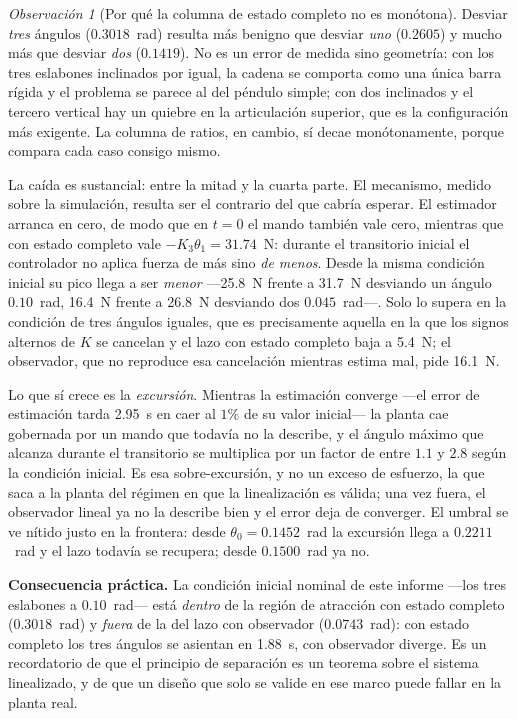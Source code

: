 \documentclass[11pt,letterpaper]{article}
\theoremstyle{definition}
\theoremstyle{plain}
\theoremstyle{remark}
\newtheorem{observacion}[definicion]{Observación}
\begin{document}
\begin{observacion}[Por qué la columna de estado completo no es monótona]
Desviar \emph{tres} ángulos ($0.3018$~rad) resulta más benigno que desviar
\emph{uno} ($0.2605$) y mucho más que desviar \emph{dos} ($0.1419$). No es un
error de medida sino geometría: con los tres eslabones inclinados por igual, la
cadena se comporta como una única barra rígida y el problema se parece al del
péndulo simple; con dos inclinados y el tercero vertical hay un quiebre en la
articulación superior, que es la configuración más exigente. La columna de
ratios, en cambio, sí decae monótonamente, porque compara cada caso consigo
mismo.
\end{observacion}

La caída es sustancial: entre la mitad y la cuarta parte. El mecanismo, medido
sobre la simulación, resulta ser el contrario del que cabría esperar. El
estimador arranca en cero, de modo que en $t=0$ el mando también vale cero,
mientras que con estado completo vale $-K_3\theta_1=31.74$~N: durante el
transitorio inicial el controlador no aplica fuerza de más sino \emph{de menos}.
Desde la misma condición inicial su pico llega a ser \emph{menor} ---25.8~N
frente a 31.7~N desviando un ángulo $0.10$~rad, 16.4~N frente a 26.8~N desviando
dos $0.045$~rad---. Solo lo supera en la condición de tres ángulos iguales, que
es precisamente aquella en la que los signos alternos de $K$ se cancelan y el
lazo con estado completo baja a 5.4~N; el observador, que no reproduce esa
cancelación mientras estima mal, pide 16.1~N.

Lo que sí crece es la \emph{excursión}. Mientras la estimación converge ---el
error de estimación tarda 2.95~s en caer al $1\%$ de su valor inicial--- la
planta cae gobernada por un mando que todavía no la describe, y el ángulo máximo
que alcanza durante el transitorio se multiplica por un factor de entre $1.1$ y
$2.8$ según la condición inicial. Es esa sobre-excursión, y no un exceso de
esfuerzo, la que saca a la planta del régimen en que la linealización es válida;
una vez fuera, el observador lineal ya no la describe bien y el error deja de
converger. El umbral se ve nítido justo en la frontera: desde
$\theta_0=0.1452$~rad la excursión llega a $0.2211$~rad y el lazo todavía se
recupera; desde $0.1500$~rad ya no.

\begin{alerta}
\small
\textbf{Consecuencia práctica.} La condición inicial nominal de este informe
---los tres eslabones a $0.10$~rad--- está \emph{dentro} de la región de
atracción con estado completo ($0.3018$~rad) y \emph{fuera} de la del lazo con
observador ($0.0743$~rad): con estado completo los tres ángulos se asientan en
1.88~s, con observador diverge. Es un recordatorio de que el principio de
separación es un
teorema sobre el sistema linealizado, y de que un diseño que solo se valide en
ese marco puede fallar en la planta real.
\end{alerta}
\end{document}
